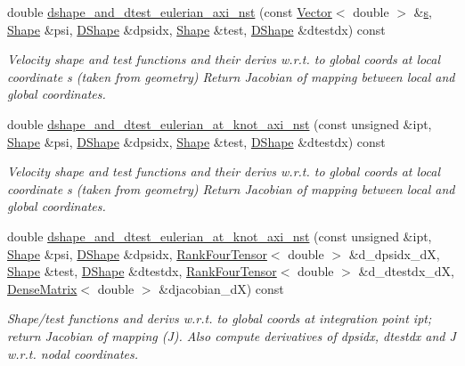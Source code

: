\begin{DoxyCompactItemize}
\item 
double \hyperlink{classoomph_1_1AxisymmetricTTaylorHoodElement_ae5d9f04db6805c64a9c1f6d5ba68c3a4}{dshape\+\_\+and\+\_\+dtest\+\_\+eulerian\+\_\+axi\+\_\+nst} (const \hyperlink{classoomph_1_1Vector}{Vector}$<$ double $>$ \&\hyperlink{cfortran_8h_ab7123126e4885ef647dd9c6e3807a21c}{s}, \hyperlink{classoomph_1_1Shape}{Shape} \&psi, \hyperlink{classoomph_1_1DShape}{D\+Shape} \&dpsidx, \hyperlink{classoomph_1_1Shape}{Shape} \&test, \hyperlink{classoomph_1_1DShape}{D\+Shape} \&dtestdx) const
\begin{DoxyCompactList}\small\item\em Velocity shape and test functions and their derivs w.\+r.\+t. to global coords at local coordinate s (taken from geometry) Return Jacobian of mapping between local and global coordinates. \end{DoxyCompactList}\item 
double \hyperlink{classoomph_1_1AxisymmetricTTaylorHoodElement_a1a696cb60dd4f10db4e6d5a8b4571a7d}{dshape\+\_\+and\+\_\+dtest\+\_\+eulerian\+\_\+at\+\_\+knot\+\_\+axi\+\_\+nst} (const unsigned \&ipt, \hyperlink{classoomph_1_1Shape}{Shape} \&psi, \hyperlink{classoomph_1_1DShape}{D\+Shape} \&dpsidx, \hyperlink{classoomph_1_1Shape}{Shape} \&test, \hyperlink{classoomph_1_1DShape}{D\+Shape} \&dtestdx) const
\begin{DoxyCompactList}\small\item\em Velocity shape and test functions and their derivs w.\+r.\+t. to global coords at local coordinate s (taken from geometry) Return Jacobian of mapping between local and global coordinates. \end{DoxyCompactList}\item 
double \hyperlink{classoomph_1_1AxisymmetricTTaylorHoodElement_a6bfdf91d1ce67542d27bee00ab026a20}{dshape\+\_\+and\+\_\+dtest\+\_\+eulerian\+\_\+at\+\_\+knot\+\_\+axi\+\_\+nst} (const unsigned \&ipt, \hyperlink{classoomph_1_1Shape}{Shape} \&psi, \hyperlink{classoomph_1_1DShape}{D\+Shape} \&dpsidx, \hyperlink{classoomph_1_1RankFourTensor}{Rank\+Four\+Tensor}$<$ double $>$ \&d\+\_\+dpsidx\+\_\+dX, \hyperlink{classoomph_1_1Shape}{Shape} \&test, \hyperlink{classoomph_1_1DShape}{D\+Shape} \&dtestdx, \hyperlink{classoomph_1_1RankFourTensor}{Rank\+Four\+Tensor}$<$ double $>$ \&d\+\_\+dtestdx\+\_\+dX, \hyperlink{classoomph_1_1DenseMatrix}{Dense\+Matrix}$<$ double $>$ \&djacobian\+\_\+dX) const
\begin{DoxyCompactList}\small\item\em Shape/test functions and derivs w.\+r.\+t. to global coords at integration point ipt; return Jacobian of mapping (J). Also compute derivatives of dpsidx, dtestdx and J w.\+r.\+t. nodal coordinates. \end{DoxyCompactList}\item 

\end{DoxyCompactItemize}
